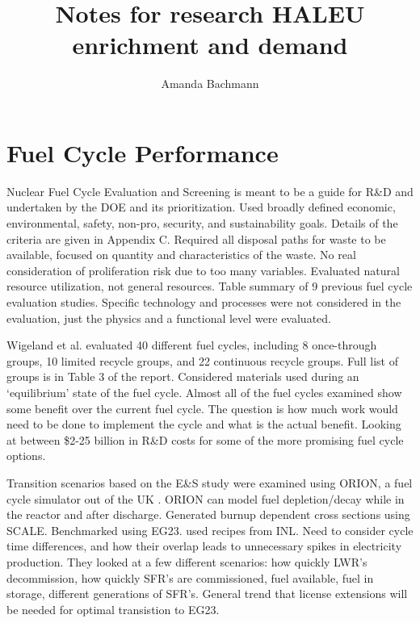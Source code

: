\documentclass{article}
\begin{document}
\title{Notes for research HALEU enrichment and demand}
\author{Amanda Bachmann}
\maketitle

\section{Fuel Cycle Performance}
Nuclear Fuel Cycle Evaluation and Screening \cite{wigeland_nuclear_2014}
is meant to be a guide for R\&D and undertaken by the DOE and its 
prioritization. Used broadly defined economic, environmental, safety, 
non-pro, security, and sustainability goals. Details of the criteria 
are given in Appendix C. Required all disposal paths for waste to be 
available, focused on quantity and characteristics of the waste. No 
real consideration of proliferation risk due to too many variables. 
Evaluated natural resource utilization, not general resources. Table 
summary of 9 previous fuel cycle evaluation studies. Specific 
technology and processes were not considered in the evaluation, 
just the physics and a functional level were evaluated. 

Wigeland et al. \cite{wigeland_nuclear_2014} evaluated 40 different 
fuel cycles, including 8 once-through groups, 10 limited recycle 
groups, and 22 continuous recycle groups. Full list of groups is 
in Table 3 of the report. Considered materials used during an 
`equilibrium' state of the fuel cycle. Almost all of the fuel cycles 
examined show some benefit over the current fuel cycle. The question 
is how much work would need to be done to implement the cycle and 
what is the actual benefit. Looking at between \$2-25 billion in 
R\&D costs for some of the more promising fuel cycle options. 

Transition scenarios based on the E\&S study were examined using 
ORION, a fuel cycle simulator out of the UK \cite{sunny_transition_2015}.
ORION can model fuel depletion/decay while in the reactor and after
discharge. Generated burnup dependent cross sections using SCALE. 
Benchmarked using EG23. used recipes from INL. Need to consider 
cycle time differences, and how their overlap leads to unnecessary 
spikes in electricity production. They looked at a few different 
scenarios: how quickly LWR's decommission, how quickly SFR's are 
commissioned, fuel available, fuel in storage, different 
generations of SFR's. General trend that license extensions will 
be needed for optimal transistion to EG23. 
\end{document}
